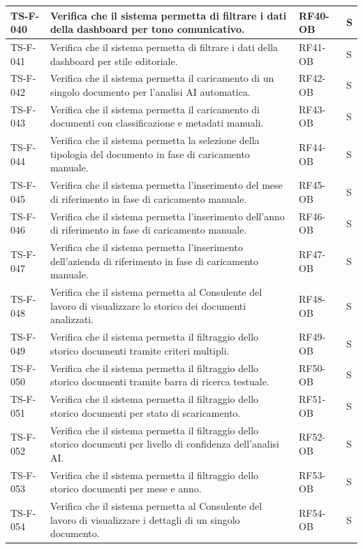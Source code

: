 \documentclass[a4paper,12pt]{article}
\begin{document}
\begin{longtable}{|p{2.2cm}|p{9.5cm}|p{2.3cm}|p{1.5cm}|}
    \hline
    TS-F-040 & Verifica che il sistema permetta di filtrare i dati della dashboard per tono comunicativo. & RF40-OB & S \\
    \hline
    TS-F-041 & Verifica che il sistema permetta di filtrare i dati della dashboard per stile editoriale. & RF41-OB & S \\
    \hline
    TS-F-042 & Verifica che il sistema permetta il caricamento di un singolo documento per l'analisi AI automatica. & RF42-OB & S \\
    \hline
    TS-F-043 & Verifica che il sistema permetta il caricamento di documenti con classificazione e metadati manuali. & RF43-OB & S \\
    \hline
    TS-F-044 & Verifica che il sistema permetta la selezione della tipologia del documento in fase di caricamento manuale. & RF44-OB & S \\
    \hline
    TS-F-045 & Verifica che il sistema permetta l'inserimento del mese di riferimento in fase di caricamento manuale. & RF45-OB & S \\
    \hline
    TS-F-046 & Verifica che il sistema permetta l'inserimento dell'anno di riferimento in fase di caricamento manuale. & RF46-OB & S \\
    \hline
    TS-F-047 & Verifica che il sistema permetta l'inserimento dell'azienda di riferimento in fase di caricamento manuale. & RF47-OB & S \\
    \hline
    TS-F-048 & Verifica che il sistema permetta al Consulente del lavoro di visualizzare lo storico dei documenti analizzati. & RF48-OB & S \\
    \hline
    TS-F-049 & Verifica che il sistema permetta il filtraggio dello storico documenti tramite criteri multipli. & RF49-OB & S \\
    \hline
    TS-F-050 & Verifica che il sistema permetta il filtraggio dello storico documenti tramite barra di ricerca testuale. & RF50-OB & S \\
    \hline
    TS-F-051 & Verifica che il sistema permetta il filtraggio dello storico documenti per stato di scaricamento. & RF51-OB & S \\
    \hline
    TS-F-052 & Verifica che il sistema permetta il filtraggio dello storico documenti per livello di confidenza dell'analisi AI. & RF52-OB & S \\
    \hline
    TS-F-053 & Verifica che il sistema permetta il filtraggio dello storico documenti per mese e anno. & RF53-OB & S \\
    \hline
    TS-F-054 & Verifica che il sistema permetta al Consulente del lavoro di visualizzare i dettagli di un singolo documento. & RF54-OB & S \\

\end{longtable}
\end{document}
